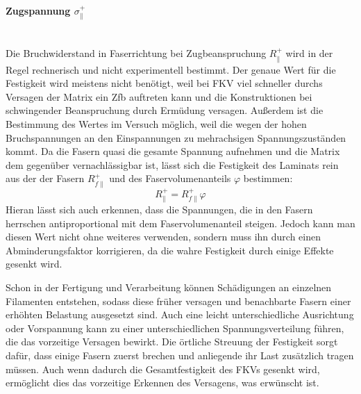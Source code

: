 \paragraph{Zugspannung $\sigma_{\parallel}^+$}~\\
Die Bruchwiderstand in Faserrichtung bei Zugbeanspruchung $R_\parallel^+$ wird in der Regel rechnerisch und nicht experimentell bestimmt. Der genaue Wert für die Festigkeit wird meistens nicht benötigt, weil bei FKV viel schneller durchs Versagen der Matrix ein Zfb auftreten kann und die Konstruktionen bei schwingender Beanspruchung durch Ermüdung versagen. Außerdem ist die Bestimmung des Wertes im Versuch möglich, weil die wegen der hohen Bruchspannungen an den Einspannungen zu mehrachsigen Spannungszuständen kommt. Da die Fasern quasi die gesamte Spannung aufnehmen und die Matrix dem gegenüber vernachlässigbar ist, lässt sich die Festigkeit des Laminats rein aus der der Fasern $R_{f \parallel}^+$ und des Faservolumenanteils $\varphi$ bestimmen:
\begin{equation}
	R_\parallel^+ = R_{f \parallel}^+\varphi
\end{equation}
Hieran lässt sich auch erkennen, dass die Spannungen, die in den Fasern herrschen antiproportional mit dem Faservolumenanteil steigen. Jedoch kann man diesen Wert nicht ohne weiteres verwenden, sondern muss ihn durch einen Abminderungsfaktor korrigieren, da die wahre Festigkeit durch einige Effekte gesenkt wird.

Schon in der Fertigung und Verarbeitung können Schädigungen an einzelnen Filamenten entstehen, sodass diese früher versagen und benachbarte Fasern einer erhöhten Belastung ausgesetzt sind. Auch eine leicht unterschiedliche Ausrichtung oder Vorspannung kann zu einer unterschiedlichen Spannungsverteilung führen, die das vorzeitige Versagen bewirkt. Die örtliche Streuung der Festigkeit sorgt dafür, dass einige Fasern zuerst brechen und anliegende ihr Last zusätzlich tragen müssen. Auch wenn dadurch die Gesamtfestigkeit des FKVs gesenkt wird, ermöglicht dies das vorzeitige Erkennen des Versagens, was erwünscht ist.
